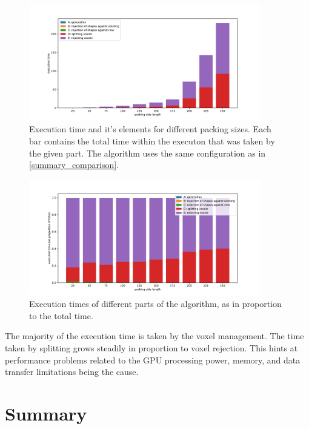 \documentclass[12pt, oneside]{report}
\begin{document}
\begin{figure}[H]
  \centering
	\includegraphics[width=0.9\textwidth,keepaspectratio]{Images/SummaryComparison/parts_total.pdf}
	\caption{Execution time and it's elements for different packing sizes. Each bar contains the total time within the executon that was taken by the given part. The algorithm uses the same configuration as in \ref{summary_comparison}. }
	\label{summary_times_total}
\end{figure}

\begin{figure}[H]
  \centering
	\includegraphics[width=0.9\textwidth,keepaspectratio]{Images/SummaryComparison/parts_proportional.pdf}
	\caption{Execution times of different parts of the algorithm, as in proportion to the total time.}
	\label{summary_times_proportional}
\end{figure}

The majority of the execution time is taken by the voxel management. The time taken by splitting grows steadily in proportion to voxel rejection. This hints at performance problems related to the GPU processing power, memory, and data transfer limitations being the cause.


\section{Summary}
\end{document}
